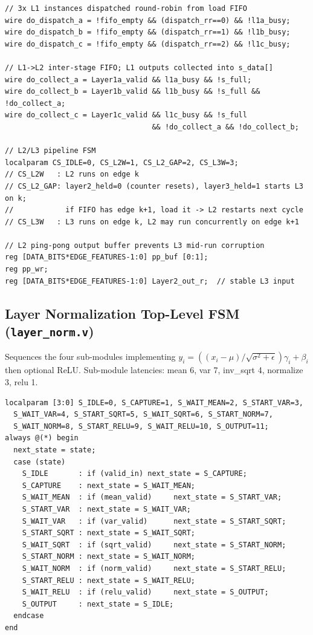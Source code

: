 \documentclass[10pt,a4paper]{article}
\begin{document}
\begin{lstlisting}
// 3x L1 instances dispatched round-robin from load FIFO
wire do_dispatch_a = !fifo_empty && (dispatch_rr==0) && !l1a_busy;
wire do_dispatch_b = !fifo_empty && (dispatch_rr==1) && !l1b_busy;
wire do_dispatch_c = !fifo_empty && (dispatch_rr==2) && !l1c_busy;

// L1->L2 inter-stage FIFO; L1 outputs collected into s_data[]
wire do_collect_a = Layer1a_valid && l1a_busy && !s_full;
wire do_collect_b = Layer1b_valid && l1b_busy && !s_full && !do_collect_a;
wire do_collect_c = Layer1c_valid && l1c_busy && !s_full
                                  && !do_collect_a && !do_collect_b;

// L2/L3 pipeline FSM
localparam CS_IDLE=0, CS_L2W=1, CS_L2_GAP=2, CS_L3W=3;
// CS_L2W   : L2 runs on edge k
// CS_L2_GAP: layer2_held=0 (counter resets), layer3_held=1 starts L3 on k;
//            if FIFO has edge k+1, load it -> L2 restarts next cycle
// CS_L3W   : L3 runs on edge k, L2 may run concurrently on edge k+1

// L2 ping-pong output buffer prevents L3 mid-run corruption
reg [DATA_BITS*EDGE_FEATURES-1:0] pp_buf [0:1];
reg pp_wr;
reg [DATA_BITS*EDGE_FEATURES-1:0] Layer2_out_r;  // stable L3 input
\end{lstlisting}

\subsection{Layer Normalization Top-Level FSM (\texttt{layer\_norm.v})}
Sequences the four sub-modules implementing
$y_i=((x_i-\mu)/\sqrt{\sigma^2+\epsilon})\gamma_i+\beta_i$ then optional
ReLU. Sub-module latencies: mean 6, var 7, inv\_sqrt 4, normalize 3,
relu 1.

\begin{lstlisting}
localparam [3:0] S_IDLE=0, S_CAPTURE=1, S_WAIT_MEAN=2, S_START_VAR=3,
  S_WAIT_VAR=4, S_START_SQRT=5, S_WAIT_SQRT=6, S_START_NORM=7,
  S_WAIT_NORM=8, S_START_RELU=9, S_WAIT_RELU=10, S_OUTPUT=11;
always @(*) begin
  next_state = state;
  case (state)
    S_IDLE       : if (valid_in) next_state = S_CAPTURE;
    S_CAPTURE    : next_state = S_WAIT_MEAN;
    S_WAIT_MEAN  : if (mean_valid)     next_state = S_START_VAR;
    S_START_VAR  : next_state = S_WAIT_VAR;
    S_WAIT_VAR   : if (var_valid)      next_state = S_START_SQRT;
    S_START_SQRT : next_state = S_WAIT_SQRT;
    S_WAIT_SQRT  : if (sqrt_valid)     next_state = S_START_NORM;
    S_START_NORM : next_state = S_WAIT_NORM;
    S_WAIT_NORM  : if (norm_valid)     next_state = S_START_RELU;
    S_START_RELU : next_state = S_WAIT_RELU;
    S_WAIT_RELU  : if (relu_valid)     next_state = S_OUTPUT;
    S_OUTPUT     : next_state = S_IDLE;
  endcase
end
\end{lstlisting}
\end{document}
